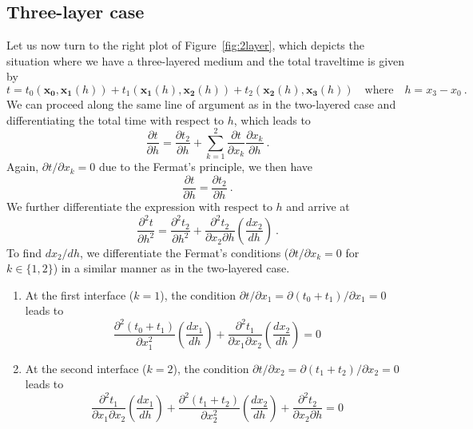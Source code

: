 
\subsection{Three-layer case}

Let us now turn to the right plot of Figure~\ref{fig:2layer}, which depicts the situation where we have a three-layered medium and the total traveltime is given by
\begin{equation}
\label{eq:time3l}
t = t_0(\mathbf{x_0},\mathbf{x_1}(h)) + t_1(\mathbf{x_1}(h),\mathbf{x_2}(h)) + t_2(\mathbf{x_2}(h),\mathbf{x_3}(h)) \quad\text{where}\quad h = x_3-x_0~.
\end{equation}
We can proceed along the same line of argument as in the two-layered case and differentiating the total time with respect to $h$, which leads to
\begin{equation}
\frac{\partial t}{\partial h} = \frac{\partial t_2}{\partial h} +  \sum^2_{k=1} \frac{\partial t}{\partial x_k}  \frac{\partial x_k}{\partial h}~.
\end{equation}
Again, $\partial t / \partial x_k = 0$ due to the Fermat's principle, we then have
\begin{equation}
\frac{\partial t}{\partial h}  = \frac{\partial t_2}{\partial h}~.
\end{equation}
We further differentiate the expression with respect to $h$ and arrive at 
\begin{equation}
\label{eq:2d3l}
\frac{\partial^2 t}{\partial h^2} = \frac{\partial^2 t_2}{\partial h^2} + \frac{\partial^2 t_2}{\partial x_2 \partial h}\left( \frac{d x_2}{d h}\right) ~.
\end{equation}
To find $d x_2/ d h$, we differentiate the Fermat's conditions ($\partial t / \partial x_k = 0$ for $k \in \{1,2\}$) in a similar manner as in the two-layered case. 
\begin{enumerate}
\item  At the first interface ($k=1$), the condition $\partial t / \partial x_1 =  \partial ( t_0+t_1) / \partial x_1  =  0$ leads to 
\begin{equation}
\label{eq:cond1}
\frac{\partial^2 (t_0 + t_1)}{\partial x_1^2} \left( \frac{d x_1}{d h}\right) + \frac{\partial^2 t_1}{\partial x_1 \partial x_2} \left( \frac{d x_2}{d h}\right) = 0
\end{equation}
\item  At the second interface ($k=2$), the condition $\partial t / \partial x_2 =  \partial ( t_1+t_2) / \partial x_2  =  0$ leads to 
\begin{equation}
\label{eq:cond2}
\frac{\partial^2 t_1}{\partial x_1 \partial x_2} \left( \frac{d x_1}{d h}\right) + \frac{\partial^2 (t_1 + t_2)}{\partial x_2^2} \left( \frac{d x_2}{d h}\right) + \frac{\partial^2 t_2}{\partial x_2 \partial h} = 0
\end{equation}
\end{enumerate}

